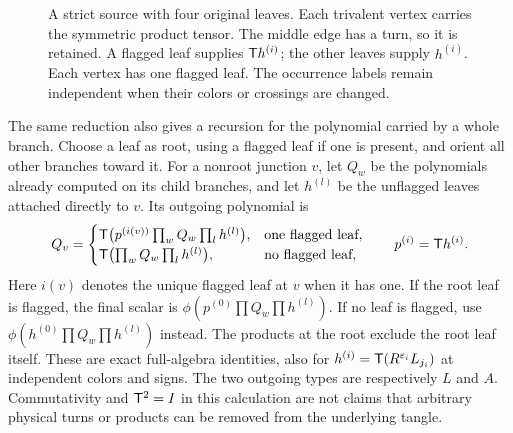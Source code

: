 \begin{figure}[ht]
\centering
\caption{A strict source with four original leaves. Each trivalent
vertex carries the symmetric product tensor. The middle edge has
a turn, so it is retained. A flagged leaf supplies $\mathsf T h^{(i)}$;
the other leaves supply $h^{(i)}$. Each vertex has one flagged
leaf. The occurrence labels remain independent when their colors or
crossings are changed.}\label{st:tree-figure}
\end{figure}

The same reduction also gives a recursion for the polynomial carried
by a whole branch. Choose a leaf as root, using a flagged leaf if
one is present, and orient all other branches toward it. For a
nonroot junction $v$, let $Q_w$ be the polynomials already computed
on its child branches, and let $h^{(l)}$ be the unflagged leaves attached
directly to $v$. Its outgoing polynomial is
\begin{equation}\label{st:messages}
 Q_v=
 \begin{cases}
 \mathsf T\bigl(p^{(i(v))}\prod_wQ_w\prod_lh^{(l)}\bigr),
       &\text{one flagged leaf},\\
 \mathsf T\bigl(\prod_wQ_w\prod_lh^{(l)}\bigr),
       &\text{no flagged leaf},
 \end{cases}
 \qquad p^{(i)}=\mathsf T h^{(i)} .
\end{equation}
Here $i(v)$ denotes the unique flagged leaf at $v$ when it has one.
If the root leaf is flagged, the final scalar is
$\phi(p^{(0)}\prod Q_w\prod h^{(l)})$. If no leaf is flagged,
use $\phi(h^{(0)}\prod Q_w\prod h^{(l)})$ instead. The products
at the root exclude the root leaf itself.
These are exact full-algebra identities, also for
$h^{(i)}=\mathsf T(R^{\varepsilon_i}L_{j_i})$ at independent colors and signs.
The two outgoing types are respectively $L$ and $A$.
Commutativity and $\mathsf T^2=I$ in this calculation are not
claims that arbitrary physical turns or products can be
removed from the underlying tangle.

